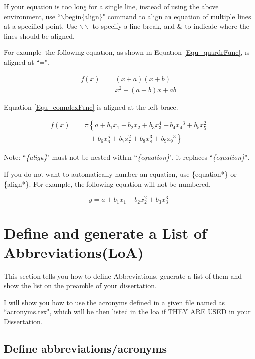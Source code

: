 If your equation is too long for a single line, instead of using the above environment,  
use ``$\backslash$begin\{align\}" command to align an equation of multiple lines at a specified point. 
Use $\backslash\backslash$ to specify a line break, and \& to indicate where  the lines should be aligned. 

For example, the following equation, as shown in Equation \ref{Equ_quardrFunc}, is aligned at ``=". 

\begin{align}
\label{Equ_quardrFunc}
f(x) &= (x+a)(x+b) \nonumber \\
&= x^2 + (a+b)x + ab
\end{align}

Equation \ref{Equ_complexFunc} is aligned at the left brace.  

\begin{align}
\label{Equ_complexFunc}
f(x) &= \pi \left\{ a + b_1x_1 + b_2x_2+ b_3x_3^4 + b_4{x_4}^3 + b_5x_5^2 \right.\nonumber\\
&\qquad \left. {} + b_6x_6^5 + b_7x_7^2+ b_8x_8^3 + b_9{x_9}^3 \right\}
\end{align}  

Note: ``\emph{\{align\}}" must not be nested within ``\emph{\{equation\}}", it replaces ``\emph{\{equation\}}".

If you do not want to automatically number an equation, use  \{equation*\} or  \{align*\}. For example, the following equation will not be numbered.   

\begin{equation*}
y = a + b_1x_1 + b_2x_2^2 + b_3x_3^3
\end{equation*}

\section{Define and generate a List of Abbreviations(LoA)}
\label{Sec_Abbr}

This section tells you how to define Abbreviations, generate a list of them and show the list on the preamble of your dissertation.
   
I will show you how to use the acronyms defined in a given file named as ``acronyms.tex", which will be then listed in the \gls{loa} if THEY ARE USED in your Dissertation.

\subsection{Define abbreviations/acronyms}

